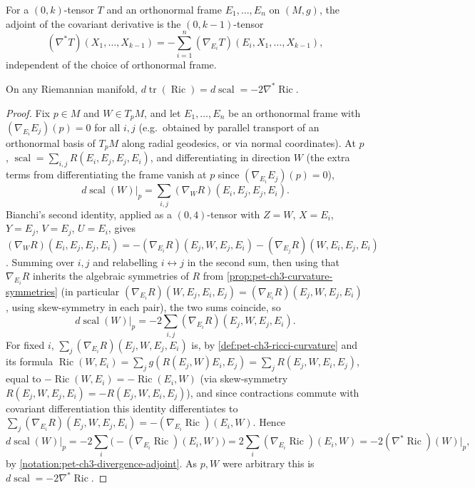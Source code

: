 \begin{notation}
  \label{notation:pet-ch3-divergence-adjoint}
  \leanok
  For a $(0,k)$-tensor $T$ and an orthonormal frame $E_1,\dots,E_n$ on $(M,g)$, the
  adjoint of the covariant derivative is the $(0,k-1)$-tensor
  \[
    (\nabla^*T)(X_1,\dots,X_{k-1})=-\sum_{i=1}^n(\nabla_{E_i}T)(E_i,X_1,\dots,X_{k-1}),
  \]
  independent of the choice of orthonormal frame.
\end{notation}

\begin{proposition}
  \label{prop:pet-ch3-contracted-bianchi}
  \leanok
  On any Riemannian manifold, $d\operatorname{tr}(\operatorname{Ric})=d\operatorname{scal}=-2\nabla^*\operatorname{Ric}$.
\end{proposition}
\begin{proof}
  \leanok
  Fix $p\in M$ and $W\in T_pM$, and let $E_1,\dots,E_n$ be an orthonormal frame
  with $(\nabla_{E_i}E_j)(p)=0$ for all $i,j$ (e.g.\ obtained by parallel
  transport of an orthonormal basis of $T_pM$ along radial geodesics, or via
  normal coordinates). At $p$, $\operatorname{scal}=\sum_{i,j}R(E_i,E_j,E_j,E_i)$, and
  differentiating in direction $W$ (the extra terms from differentiating the
  frame vanish at $p$ since $(\nabla_{E_i}E_j)(p)=0$),
  \[
    d\operatorname{scal}(W)\big|_p=\sum_{i,j}(\nabla_WR)(E_i,E_j,E_j,E_i).
  \]
  Bianchi's second identity, applied as a $(0,4)$-tensor with $Z=W$, $X=E_i$,
  $Y=E_j$, $V=E_j$, $U=E_i$, gives
  $(\nabla_WR)(E_i,E_j,E_j,E_i)=-(\nabla_{E_i}R)(E_j,W,E_j,E_i)-(\nabla_{E_j}R)(W,E_i,E_j,E_i)$.
  Summing over $i,j$ and relabelling $i\leftrightarrow j$ in the second sum, then
  using that $\nabla_{E_i}R$ inherits the algebraic symmetries of $R$ from
  \cref{prop:pet-ch3-curvature-symmetries} (in particular
  $(\nabla_{E_i}R)(W,E_j,E_i,E_j)=(\nabla_{E_i}R)(E_j,W,E_j,E_i)$, using
  skew-symmetry in each pair), the two sums coincide, so
  \[
    d\operatorname{scal}(W)\big|_p=-2\sum_{i,j}(\nabla_{E_i}R)(E_j,W,E_j,E_i).
  \]
  For fixed $i$, $\sum_j(\nabla_{E_i}R)(E_j,W,E_j,E_i)$ is, by
  \cref{def:pet-ch3-ricci-curvature} and its formula
  $\operatorname{Ric}(W,E_i)=\sum_jg(R(E_j,W)E_i,E_j)=\sum_jR(E_j,W,E_i,E_j)$,
  equal to $-\operatorname{Ric}(W,E_i)=-\operatorname{Ric}(E_i,W)$ (via
  skew-symmetry $R(E_j,W,E_j,E_i)=-R(E_j,W,E_i,E_j)$), and since contractions
  commute with covariant differentiation this identity differentiates to
  $\sum_j(\nabla_{E_i}R)(E_j,W,E_j,E_i)=-(\nabla_{E_i}\operatorname{Ric})(E_i,W)$. Hence
  \[
    d\operatorname{scal}(W)\big|_p=-2\sum_i\big(-(\nabla_{E_i}\operatorname{Ric})(E_i,W)\big)
    =2\sum_i(\nabla_{E_i}\operatorname{Ric})(E_i,W)=-2(\nabla^*\operatorname{Ric})(W)\big|_p,
  \]
  by \cref{notation:pet-ch3-divergence-adjoint}. As $p,W$ were arbitrary this is
  $d\operatorname{scal}=-2\nabla^*\operatorname{Ric}$.
\end{proof}

